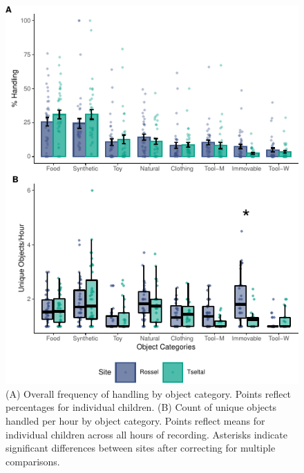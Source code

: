 \documentclass[10pt, letterpaper]{article}
\newenvironment{CodeChunk}{}{}
\begin{document}
\begin{CodeChunk}
\begin{figure}[!h]

{\centering \includegraphics{figs/overall-stats-fig-1} 

}

\caption[(A) Overall frequency of handling by object category]{(A) Overall frequency of handling by object category. Points reflect percentages for individual children. (B) Count of unique objects handled per hour by object category. Points reflect means for individual children across all hours of recording. Asterisks indicate significant differences between sites after correcting for multiple comparisons.}\label{fig:overall-stats-fig}
\end{figure}
\end{CodeChunk}
\end{document}

